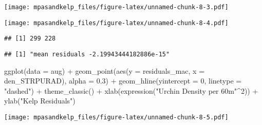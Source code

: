\documentclass[
]{article}
\newenvironment{Shaded}{\begin{snugshade}}{\end{snugshade}}
\newcommand{\AttributeTok}[1]{\textcolor[rgb]{0.77,0.63,0.00}{#1}}
\newcommand{\DecValTok}[1]{\textcolor[rgb]{0.00,0.00,0.81}{#1}}
\newcommand{\FloatTok}[1]{\textcolor[rgb]{0.00,0.00,0.81}{#1}}
\newcommand{\FunctionTok}[1]{\textcolor[rgb]{0.00,0.00,0.00}{#1}}
\newcommand{\NormalTok}[1]{#1}
\newcommand{\SpecialCharTok}[1]{\textcolor[rgb]{0.00,0.00,0.00}{#1}}
\newcommand{\StringTok}[1]{\textcolor[rgb]{0.31,0.60,0.02}{#1}}
\begin{document}
\texttt{[image: mpasandkelp\_files/figure-latex/unnamed-chunk-8-3.pdf]}

\begin{Shaded}
\end{Shaded}

\texttt{[image: mpasandkelp\_files/figure-latex/unnamed-chunk-8-4.pdf]}

\begin{verbatim}
## [1] 299 228
\end{verbatim}

\begin{Shaded}
\end{Shaded}

\begin{verbatim}
## [1] "mean residuals -2.19943444182886e-15"
\end{verbatim}

\begin{Shaded}
\begin{Highlighting}[]
\FunctionTok{ggplot}\NormalTok{(}\AttributeTok{data =}\NormalTok{ aug) }\SpecialCharTok{+}
  \FunctionTok{geom\_point}\NormalTok{(}\FunctionTok{aes}\NormalTok{(}\AttributeTok{y =}\NormalTok{ residuals\_mac, }\AttributeTok{x =}\NormalTok{ den\_STRPURAD), }\AttributeTok{alpha =} \FloatTok{0.3}\NormalTok{) }\SpecialCharTok{+}
  \FunctionTok{geom\_hline}\NormalTok{(}\AttributeTok{yintercept =} \DecValTok{0}\NormalTok{, }\AttributeTok{linetype =} \StringTok{"dashed"}\NormalTok{) }\SpecialCharTok{+}
  \FunctionTok{theme\_classic}\NormalTok{() }\SpecialCharTok{+}
  \FunctionTok{xlab}\NormalTok{(}\FunctionTok{expression}\NormalTok{(}\StringTok{"Urchin Density per 60m"}\SpecialCharTok{\^{}}\DecValTok{2}\NormalTok{)) }\SpecialCharTok{+}
  \FunctionTok{ylab}\NormalTok{(}\StringTok{"Kelp Residuals"}\NormalTok{)}
\end{Highlighting}
\end{Shaded}

\texttt{[image: mpasandkelp\_files/figure-latex/unnamed-chunk-8-5.pdf]}
\end{document}
